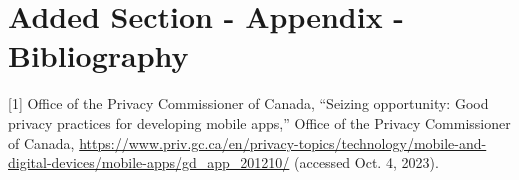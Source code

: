 \documentclass[12pt]{article}
\begin{document}
\section*{Added Section - Appendix - Bibliography}

[1] Office of the Privacy Commissioner of Canada, “Seizing opportunity: Good privacy practices for developing mobile apps,” Office of the Privacy Commissioner of Canada, \url{https://www.priv.gc.ca/en/privacy-topics/technology/mobile-and-digital-devices/mobile-apps/gd_app_201210/} (accessed Oct. 4, 2023). 
\end{document}
